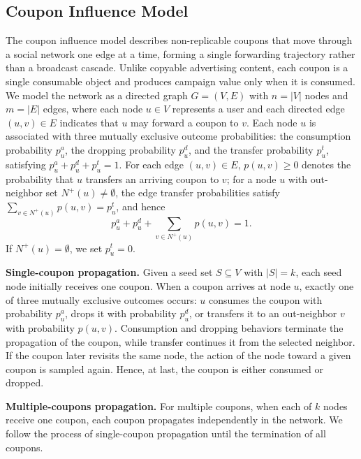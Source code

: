 \documentclass[sigconf]{acmart}
\begin{document}
\subsection{Coupon Influence Model}

The coupon influence model describes non-replicable coupons that move
through a social network one edge at a time, forming a single
forwarding trajectory rather than a broadcast cascade.
Unlike copyable advertising content, each coupon is a single
consumable object and produces campaign value only when it is
consumed.
We model the network as a directed graph $G=(V,E)$ with $n=|V|$
nodes and $m=|E|$ edges, where each node $u\in V$ represents a user
and each directed edge $(u,v)\in E$ indicates that $u$ may forward a
coupon to $v$.
Each node $u$ is associated with three mutually exclusive outcome
probabilities: the consumption probability $p_u^a$, the dropping
probability $p_u^d$, and the transfer probability $p_u^t$, satisfying
$p_u^a+p_u^d+p_u^t=1$.
For each edge $(u,v)\in E$, $p(u,v)\ge 0$ denotes the probability
that $u$ transfers an arriving coupon to $v$; for a node $u$ with
out-neighbor set $N^+(u)\neq\emptyset$, the edge transfer
probabilities satisfy $\sum_{v\in N^+(u)}p(u,v)=p_u^t$, and hence
\begin{equation}
\label{eq:normalize}
p_u^a+p_u^d+\sum_{v\in N^+(u)}p(u,v)=1.
\end{equation}
If $N^+(u)=\emptyset$, we set $p_u^t=0$.

\textbf{Single-coupon propagation.}
Given a seed set $S\subseteq V$ with $|S|=k$, each seed node initially
receives one coupon.
When a coupon arrives at node $u$, exactly one of three mutually
exclusive outcomes occurs: $u$ consumes the coupon with probability
$p_u^a$, drops it with probability $p_u^d$, or transfers it to an
out-neighbor $v$ with probability $p(u,v)$.
Consumption and dropping behaviors terminate the propagation of the coupon,
while transfer continues it from the selected neighbor.
If the coupon later revisits the same node, the action of the node toward a given coupon is sampled again. Hence, at last, the coupon is either consumed or dropped.

\textbf{Multiple-coupons propagation.}
For multiple coupons, when each of $k$ nodes receive one coupon, each coupon propagates independently in the network. We follow the process of single-coupon propagation until the termination of all coupons.
\end{document}
